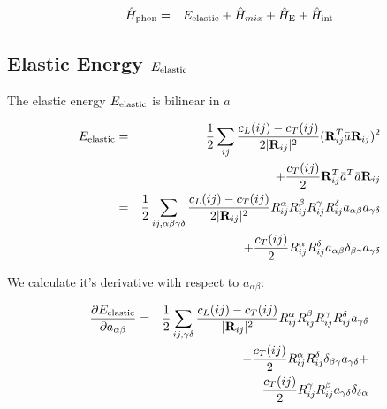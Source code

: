 \begin{eqnarray}
\hat H_{\rm phon}& =&E_{\rm elastic} +\hat  H_{mix}+\hat  H_{\rm E}+\hat H_{\rm int}
\end{eqnarray}

\subsection{Elastic Energy $E_{\rm elastic}$}

The elastic energy $E_{\rm elastic}$ is bilinear in  $a$

\begin{eqnarray}\label{Eel}
E_{\rm elastic} &=& \frac{1}{2}\sum_{ij} \frac{c_L(ij)-c_T(ij)}{2|\mathbf R_{ij}|^2} 
(\mathbf R_{ij}^T\bar a \mathbf R_{ij})^2  \\
      && + \frac{c_T(ij)}{2} \mathbf R_{ij}^T\bar a^T\bar a \mathbf R_{ij} \nonumber \\
&=& \frac{1}{2} \sum_{ij,\alpha\beta\gamma\delta} \frac{c_L(ij)-c_T(ij)}{2|\mathbf R_{ij}|^2} 
R_{ij}^{\alpha}R_{ij}^{\beta}R_{ij}^{\gamma}R_{ij}^{\delta}
a_{\alpha\beta}a_{\gamma\delta} \nonumber \\
&& + \frac{c_T(ij)}{2} R_{ij}^{\alpha} R_{ij}^{\delta}
a_{\alpha\beta} \delta_{\beta\gamma} a_{\gamma\delta}  \nonumber
\end{eqnarray}

We calculate it's derivative with respect to $a_{\alpha\beta}$:

\begin{eqnarray}
\frac{\partial E_{\rm elastic}}{\partial a_{\alpha\beta}}&=& \frac{1}{2}\sum_{ij,\gamma\delta} \frac{c_L(ij)-c_T(ij)}{|\mathbf R_{ij}|^2} 
R_{ij}^{\alpha}R_{ij}^{\beta}R_{ij}^{\gamma}R_{ij}^{\delta}
a_{\gamma\delta} \nonumber \\
&& +    \frac{c_T(ij)}{2} R_{ij}^{\alpha}R_{ij}^{\delta}
 \delta_{\beta\gamma} a_{\gamma\delta} + \nonumber \\
&& \frac{c_T(ij)}{2} R_{ij}^{\gamma} R_{ij}^{\beta}
a_{\gamma\delta} \delta_{\delta\alpha} 
\end{eqnarray}




